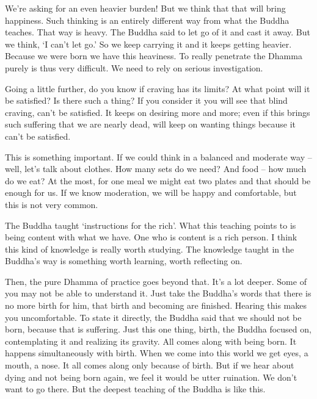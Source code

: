 We're asking for an even heavier burden! But we think that that will bring happiness. Such thinking is an entirely different way from what the Buddha teaches. That way is heavy. The Buddha said to let go of it and cast it away. But we think, `I can't let go.' So we keep carrying it and it keeps getting heavier. Because we were born we have this heaviness. To really penetrate the Dhamma purely is thus very difficult. We need to rely on serious investigation.

Going a little further, do you know if craving has its limits? At what point will it be satisfied? Is there such a thing? If you consider it you will see that  blind craving, can't be satisfied. It keeps on desiring more and more; even if this brings such suffering that we are nearly dead,  will keep on wanting things because it can't be satisfied.

This is something important. If we could think in a balanced and moderate way -- well, let's talk about clothes. How many sets do we need? And food -- how much do we eat? At the most, for one meal we might eat two plates and that should be  enough for us. If we know moderation, we will be happy and comfortable, but this is not very common.

The Buddha taught `instructions for the rich'. What this teaching points to is being content with what we have. One who is content is a rich person. I think this kind of knowledge is really worth studying. The knowledge taught in the Buddha's way is something worth learning, worth reflecting on.

Then, the pure Dhamma of practice goes beyond that. It's a lot deeper. Some of you may not be able to understand it. Just take the Buddha's words that there is no more birth for him, that birth and becoming are finished. Hearing this makes you uncomfortable. To state it directly, the Buddha said that we should not be born, because that is suffering. Just this one thing, birth, the Buddha focused on, contemplating it and realizing its gravity. All  comes along with being born. It happens simultaneously with birth. When we come into this world we get eyes, a mouth, a nose. It all comes along only because of birth. But if we hear about dying and not being born again, we feel it would be utter ruination. We don't want to go there. But the deepest teaching of the Buddha is like this.

